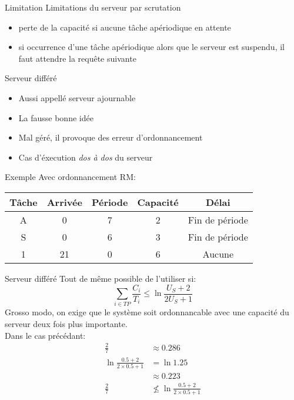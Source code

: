 \begin{frame}{Limitation} 
  Limitations du serveur par scrutation 
  \begin{itemize}
  \item perte de la capacité si aucune tâche apériodique en attente
  \item si occurrence d'une tâche apériodique alors que le serveur est
    suspendu, il faut attendre la requête suivante
  \end{itemize}
\end{frame} 

\begin{frame}{Serveur différé}
  \begin{itemize} 
  \item Aussi appellé serveur ajournable
  \item La fausse bonne idée
  \item Mal géré, il provoque des erreur d'ordonnancement
  \item Cas d'éxecution \emph{dos à dos} du serveur
  \end{itemize}
\end{frame}

\begin{frame}{Exemple}
  Avec ordonnancement RM:
  \begin{center}
    \begin{tabular}{ccccc}
      \hline
      Tâche & Arrivée & Période & Capacité & Délai \\
      \hline
      A & 0 &  7 & 2 & Fin de période\\
      S & 0 &  6 & 3 & Fin de période\\
      1 & 21 & 0 & 6 & Aucune\\
      \hline
    \end{tabular}
    \pause
    
  \end{center}
\end{frame} 

\begin{frame}{Serveur différé}
  Tout de même possible de l'utiliser si:
  $$\sum_{i \in TP} \frac{C_i}{T_i} ≤ \ln \frac{U_S + 2}{2U_S + 1}$$
  Grosso modo,  on exige  que le système  soit ordonnancable  avec une
  capacité du serveur deux fois plus importante.\\
  \pause
  Dans le cas précédant:
  \begin{align*}
    \frac{2}{7} &≈ 0.286\\
    \ln \frac{0.5 + 2}{2 \times 0.5 + 1} &=  \ln 1.25 \\
         &≈ 0.223\\
    \frac{2}{7} &\nleq \ln \frac{0.5 + 2}{2 \times 0.5 + 1}
  \end{align*}
\end{frame}

